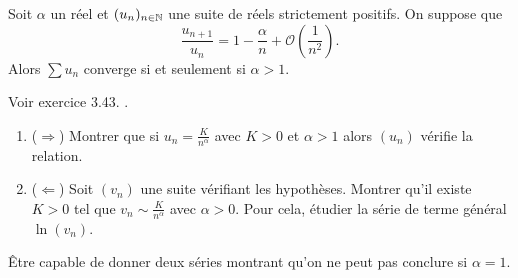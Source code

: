 \begin{theo}
    Soit $\alpha$ un réel et $(u_n)_{n \in \mathbb{N}}$ une suite de réels strictement positifs. On suppose que
    $$\displaystyle \frac{u_{n+1}}{u_n} = 1 - \frac{\alpha}{n} + \mathcal{O} \left( \frac{1}{n^2} \right).$$ Alors $\sum u_n$ converge si et seulement si $\alpha > 1$. 
\end{theo}

Voir exercice 3.43. \cite{oraux_x_ens_3}.
\begin{enumerate}
    \item ($\Rightarrow$) Montrer que si $u_n=\frac{K}{n^{\alpha}}$ avec $K>0$ et $\alpha > 1$ alors $(u_n)$ vérifie la relation.
    \item ($\Leftarrow$) Soit $(v_n)$ une suite vérifiant les hypothèses. Montrer qu'il existe $K>0$ tel que $v_n \sim \frac{K}{n^{\alpha}}$ avec $\alpha > 0$. Pour cela, étudier la série de terme général $\ln (v_n)$.
\end{enumerate}

Être capable de donner deux séries montrant qu'on ne peut pas conclure si $\alpha=1$.